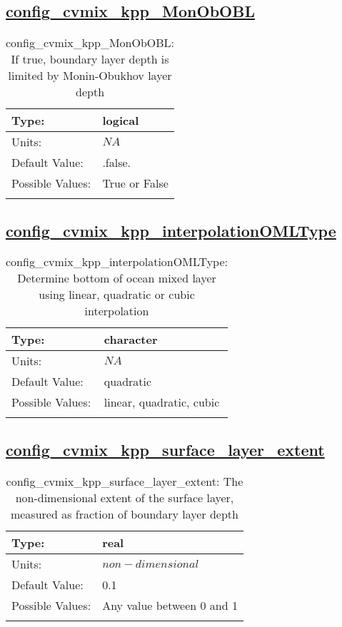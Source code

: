 \subsection[config\_cvmix\_kpp\_MonObOBL]{\hyperref[sec:nm_tab_cvmix]{config\_cvmix\_kpp\_MonObOBL}}
\label{subsec:nm_sec_config_cvmix_kpp_MonObOBL}
\begin{center}
\begin{longtable}{| p{2.0in} || p{4.0in} |}
    \hline
    Type: & logical \\
    \hline
    Units: & $NA$ \\
    \hline
    Default Value: & .false. \\
    \hline
    Possible Values: & True or False \\
    \hline
    \caption{config\_cvmix\_kpp\_MonObOBL: If true, boundary layer depth is limited by Monin-Obukhov layer depth}
\end{longtable}
\end{center}
\subsection[config\_cvmix\_kpp\_interpolationOMLType]{\hyperref[sec:nm_tab_cvmix]{config\_cvmix\_kpp\_interpolationOMLType}}
\label{subsec:nm_sec_config_cvmix_kpp_interpolationOMLType}
\begin{center}
\begin{longtable}{| p{2.0in} || p{4.0in} |}
    \hline
    Type: & character \\
    \hline
    Units: & $NA$ \\
    \hline
    Default Value: & quadratic \\
    \hline
    Possible Values: & linear, quadratic, cubic \\
    \hline
    \caption{config\_cvmix\_kpp\_interpolationOMLType: Determine bottom of ocean mixed layer using linear, quadratic or cubic interpolation}
\end{longtable}
\end{center}
\subsection[config\_cvmix\_kpp\_surface\_layer\_extent]{\hyperref[sec:nm_tab_cvmix]{config\_cvmix\_kpp\_surface\_layer\_extent}}
\label{subsec:nm_sec_config_cvmix_kpp_surface_layer_extent}
\begin{center}
\begin{longtable}{| p{2.0in} || p{4.0in} |}
    \hline
    Type: & real \\
    \hline
    Units: & $non-dimensional$ \\
    \hline
    Default Value: & 0.1 \\
    \hline
    Possible Values: & Any value between 0 and 1 \\
    \hline
    \caption{config\_cvmix\_kpp\_surface\_layer\_extent: The non-dimensional extent of the surface layer, measured as fraction of boundary layer depth}
\end{longtable}
\end{center}
